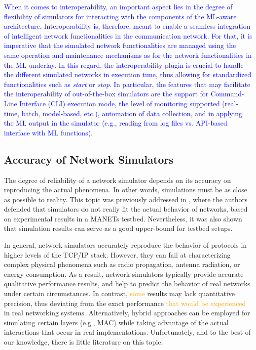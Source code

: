 \documentclass[journal]{IEEEtran}
\begin{document}
    \textcolor{blue}{When it comes to interoperability, an important aspect lies in the degree of flexibility of simulators for interacting with the components of the ML-aware architecture. Interoperability is, therefore, meant to enable a seamless integration of intelligent network functionalities in the communication network. For that, it is imperative that the simulated network functionalities are managed using the same operation and maintenance mechanisms as for the network functionalities in the ML underlay. In this regard, the interoperability plugin is crucial to handle the different simulated networks in execution time, thus allowing for standardized functionalities such as \textit{start} or \textit{stop}. In particular, the features that may facilitate the interoperability of out-of-the-box simulators are the support for Command-Line Interface (CLI) execution mode, the level of monitoring supported (real-time, batch, model-based, etc.), automation of data collection, and in applying the ML output in the simulator (e.g., reading from log files vs. API-based interface with ML functions).}
   
	\subsection{Accuracy of Network Simulators}
	The degree of reliability of a network simulator depends on its accuracy on reproducing the actual phenomena. In other words, simulations must be as close as possible to reality. This topic was previously addressed in \cite{accuracy_manet}, where the authors defended that simulators do not really fit the actual behavior of networks, based on experimental results in a MANETs testbed. Nevertheless, it was also shown that simulation results can serve as a good upper-bound for testbed setups.
		
	In general, network simulators accurately reproduce the behavior of protocols in higher levels of the TCP/IP stack. However, they can fail at characterizing complex physical phenomena such as radio propagation, antenna radiation, or energy consumption. As a result, network simulators typically provide accurate qualitative performance results, and help to predict the behavior of real networks under certain circumstances. In contrast, \textcolor{orange}{some} results may lack quantitative precision, thus deviating from the exact performance \textcolor{orange}{that would be experienced} in real networking systems. Alternatively, hybrid approaches can be employed for simulating certain layers (e.g., MAC) while taking advantage of the actual interactions that occur in real implementations. Unfortunately, and to the best of our knowledge, there is little literature on this topic. 
		
\end{document}
